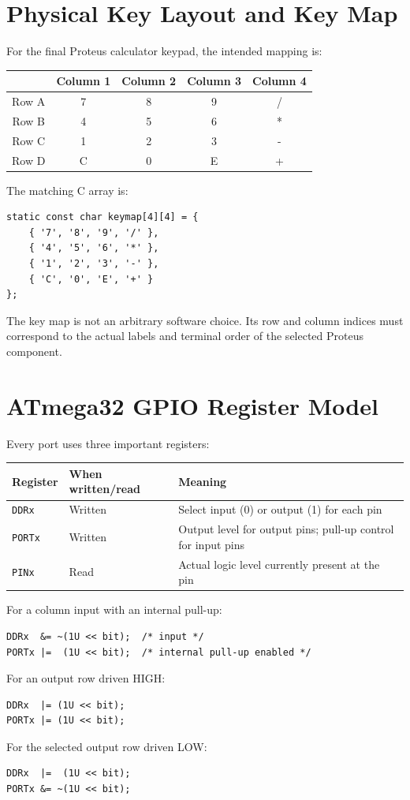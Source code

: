 \documentclass[11pt,a4paper]{article}
\begin{document}
\section{Physical Key Layout and Key Map}
For the final Proteus calculator keypad, the intended mapping is:
\begin{center}
\begin{tabular}{c|cccc}
\toprule
 & Column 1 & Column 2 & Column 3 & Column 4 \\
\midrule
Row A & 7 & 8 & 9 & / \\
Row B & 4 & 5 & 6 & * \\
Row C & 1 & 2 & 3 & - \\
Row D & C & 0 & E & + \\
\bottomrule
\end{tabular}
\end{center}
The matching C array is:
\begin{lstlisting}[style=cstyle,caption={Key map matching the final Proteus component layout.}]
static const char keymap[4][4] = {
    { '7', '8', '9', '/' },
    { '4', '5', '6', '*' },
    { '1', '2', '3', '-' },
    { 'C', '0', 'E', '+' }
};
\end{lstlisting}
The key map is not an arbitrary software choice. Its row and column indices must correspond to the actual labels and terminal order of the selected Proteus component.

\section{ATmega32 GPIO Register Model}
Every port uses three important registers:
\begin{center}
\begin{tabular}{lll}
\toprule
Register & When written/read & Meaning \\
\midrule
\texttt{DDRx} & Written & Select input (0) or output (1) for each pin \\
\texttt{PORTx} & Written & Output level for output pins; pull-up control for input pins \\
\texttt{PINx} & Read & Actual logic level currently present at the pin \\
\bottomrule
\end{tabular}
\end{center}

For a column input with an internal pull-up:
\begin{lstlisting}[style=cstyle]
DDRx  &= ~(1U << bit);  /* input */
PORTx |=  (1U << bit);  /* internal pull-up enabled */
\end{lstlisting}
For an output row driven HIGH:
\begin{lstlisting}[style=cstyle]
DDRx  |= (1U << bit);
PORTx |= (1U << bit);
\end{lstlisting}
For the selected output row driven LOW:
\begin{lstlisting}[style=cstyle]
DDRx  |=  (1U << bit);
PORTx &= ~(1U << bit);
\end{lstlisting}
\end{document}
